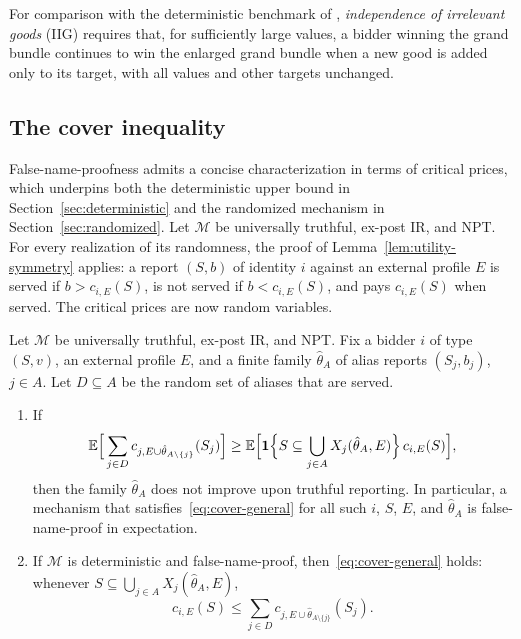 \documentclass[format=acmsmall, review=false]{acmart}
\theoremstyle{acmdefinition}%
\begin{document}
For comparison with the deterministic benchmark of
\cite[Definition~2]{iwasaki2010worst}, \emph{independence of
irrelevant goods} (IIG) requires that, for sufficiently large
values, a bidder winning the grand bundle continues to win the
enlarged grand bundle when a new good is added only to its
target, with all values and other targets unchanged.

\subsection{The cover inequality}
\label{sec:cover}

False-name-proofness admits a concise characterization in terms of
critical prices, which underpins both the deterministic upper
bound in Section~\ref{sec:deterministic} and the randomized
mechanism in Section~\ref{sec:randomized}. Let
$\mathcal M$ be universally truthful, ex-post IR, and NPT. For
every realization of its randomness, the proof of
Lemma~\ref{lem:utility-symmetry} applies: a report $(S,b)$ of
identity $i$ against an external profile $E$ is served if
$b>c_{i,E}(S)$, is not served if $b<c_{i,E}(S)$, and pays
$c_{i,E}(S)$ when served. The critical prices are now random
variables.

\begin{proposition}
\label{prop:cover}
Let $\mathcal M$ be universally truthful, ex-post IR, and NPT.
Fix a bidder $i$ of type $(S,v)$, an external profile $E$, and a
finite family $\hat\theta_A$ of alias reports $(S_j,b_j)$,
$j\in A$. Let $D\subseteq A$ be the random set of aliases that
are served.
\begin{enumerate}
\item[(a)] If
\begin{equation}\label{eq:cover-general}
\mathbb{E}\Bigl[\,\sum_{j\in D}
c_{j,E\cup\hat\theta_{A\setminus\{j\}}}(S_j)\Bigr]
\ge
\mathbb{E}\Bigl[\mathbf{1}\Bigl\{S\subseteq\bigcup_{j\in A}X_j(\hat\theta_A,E)\Bigr\}\,
c_{i,E}(S)\Bigr],
\end{equation}
then the family $\hat\theta_A$ does not improve upon truthful
reporting. In particular, a mechanism that
satisfies~\eqref{eq:cover-general} for all such $i$, $S$, $E$,
and $\hat\theta_A$ is false-name-proof in expectation.
\item[(b)] If $\mathcal M$ is deterministic and
false-name-proof, then~\eqref{eq:cover-general} holds: whenever
$S\subseteq\bigcup_{j\in A}X_j(\hat\theta_A,E)$,
\[
c_{i,E}(S)\le\sum_{j\in D}
c_{j,E\cup\hat\theta_{A\setminus\{j\}}}(S_j).
\]
\end{enumerate}
\end{proposition}
\end{document}
